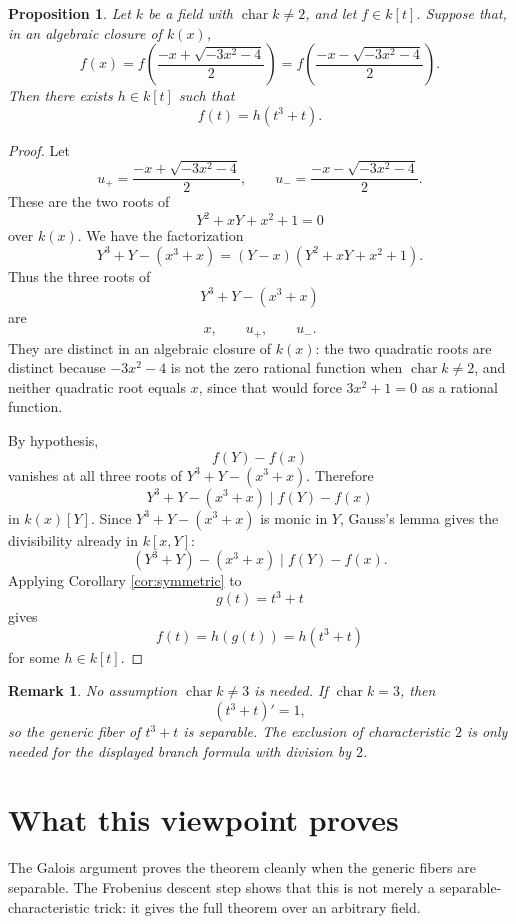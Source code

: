 \documentclass[12pt]{article}
\newtheorem{proposition}[theorem]{Proposition}
\newtheorem{remark}[theorem]{Remark}
\begin{document}
\begin{proposition}\label{prop:functional-equation}
Let \(k\) be a field with \(\operatorname{char}k\neq2\), and let \(f\in k[t]\).  Suppose that, in an algebraic closure of \(k(x)\),
\[
    f(x)
    =
    f\left(\frac{-x+\sqrt{-3x^2-4}}{2}\right)
    =
    f\left(\frac{-x-\sqrt{-3x^2-4}}{2}\right).
\]
Then there exists \(h\in k[t]\) such that
\[
    f(t)=h(t^3+t).
\]
\end{proposition}

\begin{proof}
Let
\[
    u_+=\frac{-x+\sqrt{-3x^2-4}}{2},
    \qquad
    u_-=\frac{-x-\sqrt{-3x^2-4}}{2}.
\]
These are the two roots of
\[
    Y^2+xY+x^2+1=0
\]
over \(k(x)\).  We have the factorization
\[
    Y^3+Y-(x^3+x)
    =
    (Y-x)(Y^2+xY+x^2+1).
\]
Thus the three roots of
\[
    Y^3+Y-(x^3+x)
\]
are
\[
    x,
    \qquad
    u_+,
    \qquad
    u_-.
\]
They are distinct in an algebraic closure of \(k(x)\): the two quadratic roots are distinct because \(-3x^2-4\) is not the zero rational function when \(\operatorname{char}k\neq2\), and neither quadratic root equals \(x\), since that would force \(3x^2+1=0\) as a rational function.

By hypothesis,
\[
    f(Y)-f(x)
\]
vanishes at all three roots of \(Y^3+Y-(x^3+x)\).  Therefore
\[
    Y^3+Y-(x^3+x)
    \mid
    f(Y)-f(x)
\]
in \(k(x)[Y]\).  Since \(Y^3+Y-(x^3+x)\) is monic in \(Y\), Gauss's lemma gives the divisibility already in \(k[x,Y]\):
\[
    (Y^3+Y)-(x^3+x)
    \mid
    f(Y)-f(x).
\]
Applying Corollary \ref{cor:symmetric} to
\[
    g(t)=t^3+t
\]
gives
\[
    f(t)=h(g(t))=h(t^3+t)
\]
for some \(h\in k[t]\).
\end{proof}

\begin{remark}
No assumption \(\operatorname{char}k\neq3\) is needed.  If \(\operatorname{char}k=3\), then
\[
    (t^3+t)'=1,
\]
so the generic fiber of \(t^3+t\) is separable.  The exclusion of characteristic \(2\) is only needed for the displayed branch formula with division by \(2\).
\end{remark}

\section{What this viewpoint proves}

The Galois argument proves the theorem cleanly when the generic fibers are separable.  The Frobenius descent step shows that this is not merely a separable-characteristic trick: it gives the full theorem over an arbitrary field.
\end{document}
